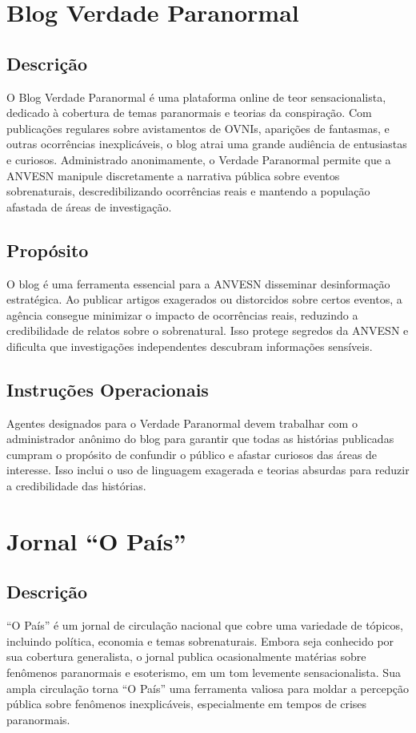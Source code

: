 \documentclass{book}
\begin{document}
\tableofcontents

\mainmatter

\chapter{Blog Verdade Paranormal}
\section{Descrição}
O Blog Verdade Paranormal é uma plataforma online de teor sensacionalista, dedicado à cobertura de temas paranormais e teorias da conspiração. Com publicações regulares sobre avistamentos de OVNIs, aparições de fantasmas, e outras ocorrências inexplicáveis, o blog atrai uma grande audiência de entusiastas e curiosos. Administrado anonimamente, o Verdade Paranormal permite que a ANVESN manipule discretamente a narrativa pública sobre eventos sobrenaturais, descredibilizando ocorrências reais e mantendo a população afastada de áreas de investigação.

\section{Propósito}
O blog é uma ferramenta essencial para a ANVESN disseminar desinformação estratégica. Ao publicar artigos exagerados ou distorcidos sobre certos eventos, a agência consegue minimizar o impacto de ocorrências reais, reduzindo a credibilidade de relatos sobre o sobrenatural. Isso protege segredos da ANVESN e dificulta que investigações independentes descubram informações sensíveis.

\section{Instruções Operacionais}
Agentes designados para o Verdade Paranormal devem trabalhar com o administrador anônimo do blog para garantir que todas as histórias publicadas cumpram o propósito de confundir o público e afastar curiosos das áreas de interesse. Isso inclui o uso de linguagem exagerada e teorias absurdas para reduzir a credibilidade das histórias.

\chapter{Jornal ``O País''}
\section{Descrição}
``O País'' é um jornal de circulação nacional que cobre uma variedade de tópicos, incluindo política, economia e temas sobrenaturais. Embora seja conhecido por sua cobertura generalista, o jornal publica ocasionalmente matérias sobre fenômenos paranormais e esoterismo, em um tom levemente sensacionalista. Sua ampla circulação torna ``O País'' uma ferramenta valiosa para moldar a percepção pública sobre fenômenos inexplicáveis, especialmente em tempos de crises paranormais.
\end{document}
